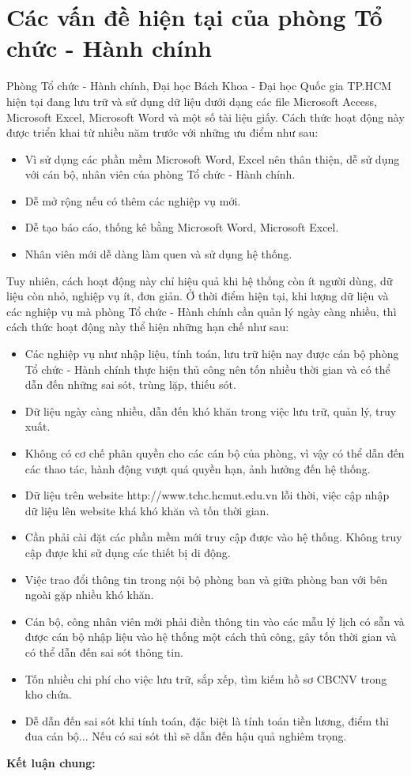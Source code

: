 \section{Các vấn đề hiện tại của phòng Tổ chức - Hành chính}
Phòng Tổ chức - Hành chính, Đại học Bách Khoa - Đại học Quốc gia TP.HCM hiện tại đang lưu trữ và sử dụng dữ liệu dưới dạng các file Microsoft Access, Microsoft Excel, Microsoft Word và một số tài liệu giấy. Cách thức hoạt động này được triển khai từ nhiều năm trước với những ưu điểm như sau:
\begin{itemize}
    \item Vì sử dụng các phần mềm Microsoft Word, Excel nên thân thiện, dễ sử dụng với cán bộ, nhân viên của phòng Tổ chức - Hành chính.
    \item Dễ mở rộng nếu có thêm các nghiệp vụ mới.
    \item Dễ tạo báo cáo, thống kê bằng Microsoft Word, Microsoft Excel.
    \item Nhân viên mới dễ dàng làm quen và sử dụng hệ thống.
\end{itemize}
Tuy nhiên, cách hoạt động này chỉ hiệu quả khi hệ thống còn ít người dùng, dữ liệu còn nhỏ, nghiệp vụ ít, đơn giản. Ở thời điểm hiện tại, khi lượng dữ liệu và các nghiệp vụ mà phòng Tổ chức - Hành chính cần quản lý ngày càng nhiều, thì cách thức hoạt động này thể hiện những hạn chế như sau: 
\begin{itemize}
    \item Các nghiệp vụ như nhập liệu, tính toán, lưu trữ hiện nay được cán bộ phòng Tổ chức - Hành chính thực hiện thủ công nên tốn nhiều thời gian và có thể dẫn đến những sai sót, trùng lặp, thiếu sót.
    \item Dữ liệu ngày càng nhiều, dẫn đến khó khăn trong việc lưu trữ, quản lý, truy xuất.
    \item Không có cơ chế phân quyền cho các cán bộ của phòng, vì vậy có thể dẫn đến các thao tác, hành động vượt quá quyền hạn, ảnh hưởng đến hệ thống. 
    \item Dữ liệu trên website http://www.tchc.hcmut.edu.vn lỗi thời, việc cập nhập dữ liệu lên website khá khó khăn và tốn thời gian.
    \item Cần phải cài đặt các phần mềm mới truy cập được vào hệ thống. Không truy cập được khi sử dụng các thiết bị di động.
    \item Việc trao đổi thông tin trong nội bộ phòng ban và giữa phòng ban với bên ngoài gặp nhiều khó khăn.
    \item Cán bộ, công nhân viên mới phải điền thông tin vào các mẫu lý lịch có sẵn và được cán bộ nhập liệu vào hệ thống một cách thủ công, gây tốn thời gian và có thể dẫn đến sai sót thông tin.
    \item Tốn nhiều chi phí cho việc lưu trữ, sắp xếp, tìm kiếm hồ sơ CBCNV trong kho chứa.
    \item Dễ dẫn đến sai sót khi tính toán, đặc biệt là tính toán tiền lương, điểm thi đua cán bộ... Nếu có sai sót thì sẽ dẫn đến hậu quả nghiêm trọng.
\end{itemize}
\textbf{Kết luận chung:}

